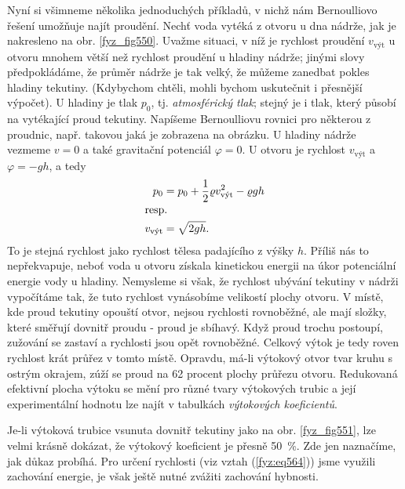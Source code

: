 {    Nyní si všimneme několika jednoduchých příkladů, v nichž nám Bernoulliovo řešení umožňuje najít 
    proudění. Nechť voda vytéká z otvoru u dna nádrže, jak je nakresleno na obr. \ref{fyz_fig550}. 
    Uvažme situaci, v níž je rychlost proudění \(v_{\text{výt}}\) u otvoru mnohem větší než 
    rychlost proudění u hladiny nádrže; jinými slovy předpokládáme, že průměr nádrže je tak velký, 
    že můžeme zanedbat pokles hladiny tekutiny. (Kdybychom chtěli, mohli bychom uskutečnit i 
    přesnější výpočet). U hladiny je tlak \(p_0\), tj. \emph{atmosférický tlak}; stejný je i tlak, 
    který působí na vytékající proud tekutiny. Napíšeme Bernoulliovu rovnici pro některou z 
    proudnic, např. takovou jaká je zobrazena na obrázku. U hladiny nádrže vezmeme \(v = 0\) a také 
    gravitační potenciál \(\varphi = 0\). U otvoru je rychlost \(v_{\text{výt}}\) a \(\varphi= 
    -gh\), a tedy
    \begin{align}
      p_0 &= p_0 + \dfrac{1}{2}\varrho v_{\text{výt}}^2 - \varrho gh \nonumber \\
      \shortintertext{resp.}
      v_{\text{výt}} &= \sqrt{2gh}.                                   \label{fyz:eq564}
    \end{align}
    To je stejná rychlost jako rychlost tělesa padajícího z výšky \(h\). Příliš nás to 
    nepřekvapuje, neboť voda u otvoru získala kinetickou energii na úkor potenciální energie vody u 
    hladiny. Nemysleme si však, že rychlost ubývání tekutiny v nádrži vypočítáme tak, že tuto 
    rychlost vynásobíme velikostí plochy otvoru. V místě, kde proud tekutiny opouští otvor, nejsou 
    rychlosti rovnoběžné, ale mají složky, které směřují dovnitř proudu - proud je sbíhavý. Když 
    proud trochu postoupí, zužování se zastaví a rychlosti jsou opět rovnoběžné. Celkový výtok je 
    tedy roven rychlost krát průřez v tomto místě. Opravdu, má-li výtokový otvor tvar kruhu s 
    ostrým okrajem, zúží se proud na \num{62} procent plochy průřezu otvoru. Redukovaná efektivní 
    plocha výtoku se mění pro různé tvary výtokových trubic a její experimentální hodnotu lze najít 
    v tabulkách \emph{výtokových koeficientů}.
    
    Je-li výtoková trubice vsunuta dovnitř tekutiny jako na obr. \ref{fyz_fig551}, lze velmi krásně 
    dokázat, že výtokový koeficient je přesně \SI{50}{\percent}. Zde jen naznačíme, jak důkaz 
    probíhá. Pro určení rychlosti (viz vztah (\ref{fyz:eq564})) jsme využili zachování energie, je 
    však ještě nutné zvážiti zachování hybnosti.
    
}
